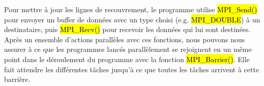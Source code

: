 \documentclass[a4paper,table]{article}
\begin{document}
Pour mettre à jour les lignes de recouvrement, le programme utilise
\hl{MPI\_Send()} pour envoyer un buffer de données avec un type choisi
(e.g. \hl{MPI\_DOUBLE}) à un destinataire, puis \hl{MPI\_Recv()} pour recevoir
les données qui lui sont destinées. \\

Après un ensemble d'actions parallèles avec ces fonctions, nous pouvons nous
assurer à ce que les programmes lancés parallèlement se rejoignent en un même
point dans le déroulement du programme avec la fonction \hl{MPI\_Barrier()}.
Elle fait attendre les différentes tâches jusqu'à ce que toutes les tâches
arrivent à cette barrière.
\end{document}
